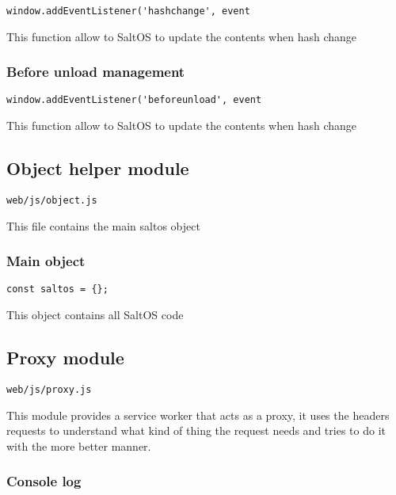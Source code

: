 \documentclass[a4paper]{article}
\begin{document}
\begin{lstlisting}
window.addEventListener('hashchange', event
\end{lstlisting}

This function allow to SaltOS to update the contents when hash change

\hypertarget{toc816}{}
\subsubsection{Before unload management}

\begin{lstlisting}
window.addEventListener('beforeunload', event
\end{lstlisting}

This function allow to SaltOS to update the contents when hash change

\hypertarget{toc817}{}
\subsection{Object helper module}

\begin{lstlisting}
web/js/object.js
\end{lstlisting}

This file contains the main saltos object

\hypertarget{toc818}{}
\subsubsection{Main object}

\begin{lstlisting}
const saltos = {};
\end{lstlisting}

This object contains all SaltOS code

\hypertarget{toc819}{}
\subsection{Proxy module}

\begin{lstlisting}
web/js/proxy.js
\end{lstlisting}

This module provides a service worker that acts as a proxy, it uses the headers
requests to understand what kind of thing the request needs and tries to do
it with the more better manner.

\hypertarget{toc820}{}
\subsubsection{Console log}
\end{document}

